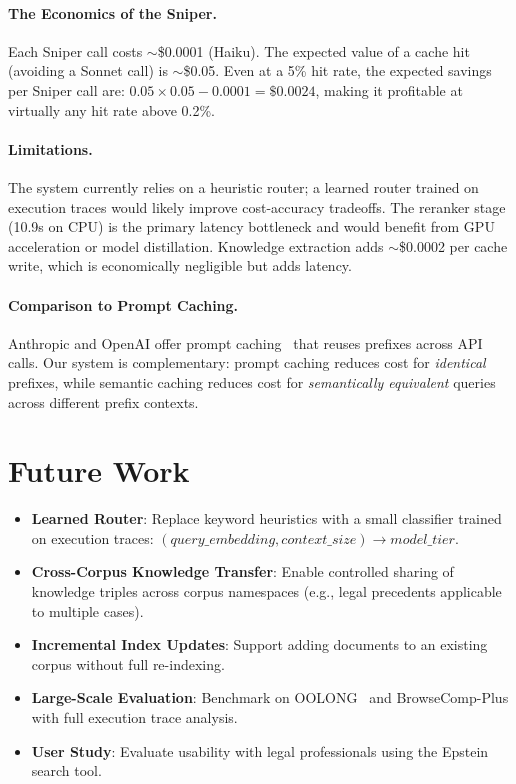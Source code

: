 \documentclass[11pt,twocolumn]{article}
\begin{document}
\paragraph{The Economics of the Sniper.}
Each Sniper call costs $\sim$\$0.0001 (Haiku). The expected value of a cache hit (avoiding a Sonnet call) is $\sim$\$0.05. Even at a 5\% hit rate, the expected savings per Sniper call are: $0.05 \times 0.05 - 0.0001 = \$0.0024$, making it profitable at virtually any hit rate above 0.2\%.

\paragraph{Limitations.}
The system currently relies on a heuristic router; a learned router trained on execution traces would likely improve cost-accuracy tradeoffs. The reranker stage (10.9s on CPU) is the primary latency bottleneck and would benefit from GPU acceleration or model distillation. Knowledge extraction adds $\sim$\$0.0002 per cache write, which is economically negligible but adds latency.

\paragraph{Comparison to Prompt Caching.}
Anthropic and OpenAI offer prompt caching~\cite{anthropic2024caching} that reuses prefixes across API calls. Our system is complementary: prompt caching reduces cost for \textit{identical} prefixes, while semantic caching reduces cost for \textit{semantically equivalent} queries across different prefix contexts.

\section{Future Work}
\label{sec:future}

\begin{itemize}
    \item \textbf{Learned Router}: Replace keyword heuristics with a small classifier trained on execution traces: $(query\_embedding, context\_size) \to model\_tier$.
    \item \textbf{Cross-Corpus Knowledge Transfer}: Enable controlled sharing of knowledge triples across corpus namespaces (e.g., legal precedents applicable to multiple cases).
    \item \textbf{Incremental Index Updates}: Support adding documents to an existing corpus without full re-indexing.
    \item \textbf{Large-Scale Evaluation}: Benchmark on OOLONG~\cite{zhang2025rlm} and BrowseComp-Plus with full execution trace analysis.
    \item \textbf{User Study}: Evaluate usability with legal professionals using the Epstein search tool.
\end{itemize}
\end{document}

